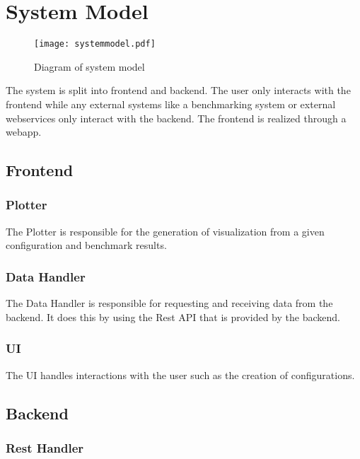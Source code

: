 \section{System Model}

\begin{figure}[H]
    \texttt{[image: systemmodel.pdf]}
    \caption{Diagram of system model}
    \label{fig:systemmodel}
\end{figure}

The system is split into frontend and backend. The \gls{user} only interacts with the frontend while any external systems like a benchmarking system or external webservices only interact with the backend. The frontend is realized through a webapp.

\subsection{Frontend}

\subsubsection*{Plotter}

The Plotter is responsible for the generation of \gls{visualization} from a given \gls{configuration} and benchmark results. 

\subsubsection*{Data Handler}

The Data Handler is responsible for requesting and receiving data from the backend. It does this by using the Rest API that is provided by the backend.

\subsubsection*{UI}

The UI handles interactions with the \gls{user} such as the creation of \glspl{configuration}.

\subsection{Backend}

\subsubsection*{Rest Handler}

